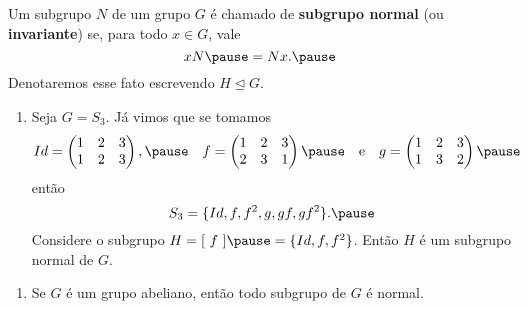 \documentclass{beamer}
\begin{document}
    \begin{frame}
        \begin{definicao}
            Um subgrupo $N$ \pause de um grupo $G$ \pause \'e chamado de \textbf{subgrupo normal} \pause (ou \textbf{invariante}) \pause se, para todo $x \in G$, \pause vale
            \[
                xN \pause = Nx. \pause
            \]
            Denotaremos esse fato escrevendo $H \unlhd G$.
        \end{definicao}
    \end{frame}

    \begin{frame}
        \begin{exemplos}
            \begin{enumerate}[label=({\arabic*})]
                \item Seja $G = S_3$. \pause J\'a vimos que se tomamos
                \[
                    Id = \begin{pmatrix}
                        1 & 2 & 3\\
                        1 & 2 & 3
                    \end{pmatrix}, \pause \quad
                    f = \begin{pmatrix}
                        1 & 2 & 3\\
                        2 & 3 & 1
                    \end{pmatrix} \pause \quad \mbox{e}\quad
                    g = \begin{pmatrix}
                        1 & 2 & 3\\
                        1 & 3 & 2
                    \end{pmatrix} \pause
                \]
                ent\~ao
                \[
                    S_3 = \{Id, f, f^2, g, gf, gf^2\}. \pause
                \]
                Considere o subgrupo $H = [\ f\ ] \pause = \{Id, f, f^2\}$. \pause Ent\~ao $H$ \'e um subgrupo normal de $G$.

                \seti
            \end{enumerate}
        \end{exemplos}
    \end{frame}

    \begin{frame}
        \begin{exemplos}
            \begin{enumerate}[label=({\arabic*})]
                \conti

                \item Se $G$ \'e um grupo abeliano, \pause ent\~ao todo subgrupo de $G$ \'e normal.

                \seti
            \end{enumerate}
        \end{exemplos}
    \end{frame}
\end{document}
